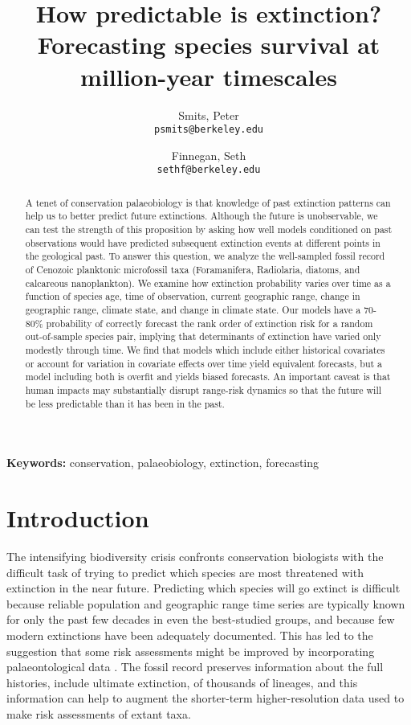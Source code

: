 \documentclass[12pt,letterpaper]{article}
\title{How predictable is extinction? Forecasting species survival at million-year timescales}
\author{
 Smits, Peter\\
 \texttt{psmits@berkeley.edu} 
 \and
 Finnegan, Seth\\
 \texttt{sethf@berkeley.edu}
}
\date{}
\begin{document}
\begin{refsection}

\maketitle

\linenumbers{}
\modulolinenumbers[3]

\begin{abstract}
  A tenet of conservation palaeobiology is that knowledge of past extinction patterns can help us to better predict future extinctions. Although the future is unobservable, we can test the strength of this proposition by asking how well models conditioned on past observations would have predicted subsequent extinction events at different points in the geological past. To answer this question, we analyze the well-sampled fossil record of Cenozoic planktonic microfossil taxa (Foramanifera, Radiolaria, diatoms, and calcareous nanoplankton). We examine how extinction probability varies over time as a function of species age, time of observation, current geographic range, change in geographic range, climate state, and change in climate state. Our models have a 70-80\% probability of correctly forecast the rank order of extinction risk for a random out-of-sample species pair, implying that determinants of extinction have varied only modestly through time. We find that models which include either historical covariates or account for variation in covariate effects over time yield equivalent forecasts, but a model including both is overfit and yields biased forecasts. An important caveat is that human impacts may substantially disrupt range-risk dynamics so that the future will be less predictable than it has been in the past.

\end{abstract}

{\bf Keywords:} conservation, palaeobiology, extinction, forecasting



\section{Introduction}

The intensifying biodiversity crisis confronts conservation biologists with the difficult task of trying to predict which species are most threatened with extinction in the near future. Predicting which species will go extinct is difficult because reliable population and geographic range time series are typically known for only the past few decades in even the best-studied groups, and because few modern extinctions have been adequately documented. This has led to the suggestion that some risk assessments might be improved by incorporating palaeontological data \citep{Finnegan2015,Kiessling2016}. The fossil record preserves information about the full histories, include ultimate extinction, of thousands of lineages, and this information can help to augment the shorter-term higher-resolution data used to make risk assessments of extant taxa.


\end{refsection}
\end{document}
